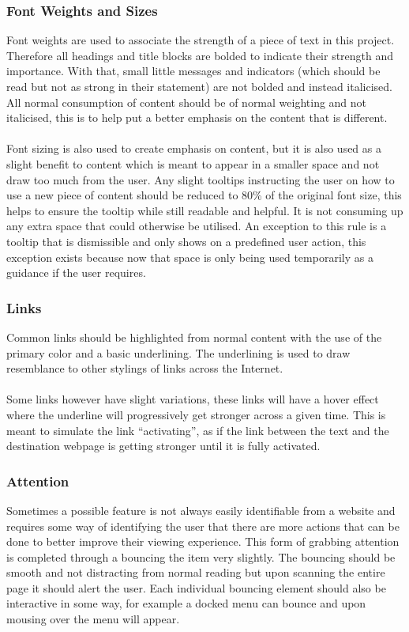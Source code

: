 \subsubsection{Font Weights and Sizes}
Font weights are used to associate the strength of a piece of text in this project. Therefore all headings and title blocks are bolded to indicate their strength and importance. With that, small little messages and indicators (which should be read but not as strong in their statement) are not bolded and instead italicised. All normal consumption of content should be of normal weighting and not italicised, this is to help put a better emphasis on the content that is different.\\\\
Font sizing is also used to create emphasis on content, but it is also used as a slight benefit to content which is meant to appear in a smaller space and not draw too much from the user. Any slight tooltips instructing the user on how to use a new piece of content should be reduced to 80\% of the original font size, this helps to ensure the tooltip while still readable and helpful. It is not consuming up any extra space that could otherwise be utilised. An exception to this rule is a tooltip that is dismissible and only shows on a predefined user action, this exception exists because now that space is only being used temporarily as a guidance if the user requires.

\subsubsection{Links}
Common links should be highlighted from normal content with the use of the primary color and a basic underlining. The underlining is used to draw resemblance to other stylings of links across the Internet.\\\\
Some links however have slight variations, these links will have a hover effect where the underline will progressively get stronger across a given time. This is meant to simulate the link ``activating'', as if the link between the text and the destination webpage is getting stronger until it is fully activated.

\subsubsection{Attention}
Sometimes a possible feature is not always easily identifiable from a website and requires some way of identifying the user that there are more actions that can be done to better improve their viewing experience. This form of grabbing attention is completed through a bouncing the item very slightly. The bouncing should be smooth and not distracting from normal reading but upon scanning the entire page it should alert the user. Each individual bouncing element should also be interactive in some way, for example a docked menu can bounce and upon mousing over the menu will appear.

